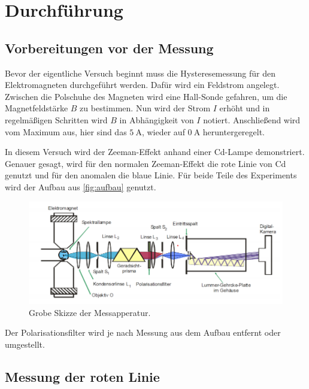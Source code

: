 \section{Durchführung}
\label{sec:Durchführung}

\subsection{Vorbereitungen vor der Messung}
\label{ssec:durch1}

Bevor der eigentliche Versuch beginnt muss die Hysteresemessung für den Elektromagneten durchgeführt werden.
Dafür wird ein Feldstrom angelegt.
Zwischen die Polschuhe des Magneten wird eine Hall-Sonde gefahren, um die Magnetfeldstärke $B$ zu bestimmen.
Nun wird der Strom $I$ erhöht und in regelmäßigen Schritten wird $B$ in Abhängigkeit von $I$ notiert. 
Anschließend wird vom Maximum aus, hier sind das $\SI{5}{\ampere}$, wieder auf $\SI{0}{\ampere}$ heruntergeregelt.

In diesem Versuch wird der Zeeman-Effekt anhand einer Cd-Lampe demonstriert.
Genauer gesagt, wird für den normalen Zeeman-Effekt die rote Linie von Cd genutzt und für den anomalen die blaue Linie.
Für beide Teile des Experiments wird der Aufbau aus \autoref{fig:aufbau} genutzt. 
\begin{figure}
    \centering
    \includegraphics[width=\textwidth]{images/aufbau1.png}
    \caption{Grobe Skizze der Messapperatur. \cite{V27}}
    \label{fig:aufbau}
\end{figure}
Der Polarisationsfilter wird je nach Messung aus dem Aufbau entfernt oder umgestellt.

\subsection{Messung der roten Linie}
\label{ssec:durch2}

